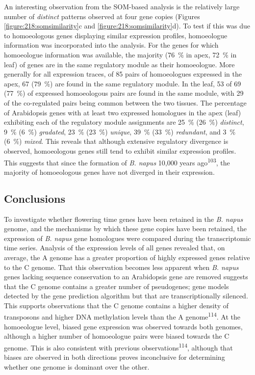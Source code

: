 \documentclass[12pt,]{book}
\begin{document}
An interesting observation from the SOM-based analysis is the relatively
large number of \emph{distinct} patterns observed at four gene copies
(Figures \ref{figure:218:somsimilarity}c and
\ref{figure:218:somsimilarity}d). To test if this was due to
homoeologous genes displaying similar expression profiles, homoeologue
information was incorporated into the analysis. For the genes for which
homoeologue information was available, the majority (76~\% in apex,
72~\% in leaf) of genes are in the same regulatory module as their
homoeologue. More generally for all expression traces, of 85 pairs of
homoeologues expressed in the apex, 67 (79~\%) are found in the same
regulatory module. In the leaf, 53 of 69 (77~\%) of expressed
homoeologous pairs are found in the same module, with 29 of the
co-regulated pairs being common between the two tissues. The percentage
of Arabidopsis genes with at least two expressed homologues in the apex
(leaf) exhibiting each of the regulatory module assignments are 25~\%
(26~\%) \emph{distinct}, 9~\% (6~\%) \emph{gradated}, 23~\% (23~\%)
\emph{unique}, 39~\% (33~\%) \emph{redundant}, and 3~\% (6~\%)
\emph{mixed}. This reveals that although extensive regulatory divergence
is observed, homoeologous genes still tend to exhibit similar expression
profiles. This suggests that since the formation of \emph{B. napus}
10,000 years ago\textsuperscript{103}, the majority of homoeologous
genes have not diverged in their expression.

\subsection{Conclusions}\label{conclusions-1}

To investigate whether flowering time genes have been retained in the
\emph{B. napus} genome, and the mechanisms by which these gene copies
have been retained, the expression of \emph{B. napus} gene homologues
were compared during the transcriptomic time series. Analysis of the
expression levels of all genes revealed that, on average, the A genome
has a greater proportion of highly expressed genes relative to the C
genome. That this observation becomes less apparent when \emph{B. napus}
genes lacking sequence conservation to an Arabidopsis gene are removed
suggests that the C genome contains a greater number of pseudogenes;
gene models detected by the gene prediction algorithm but that are
transcriptionally silenced. This supports observations that the C genome
contains a higher density of transposons and higher DNA methylation
levels than the A genome\textsuperscript{114}. At the homoeologue level,
biased gene expression was observed towards both genomes, although a
higher number of homoeologue pairs were biased towards the C genome.
This is also consistent with previous observations\textsuperscript{114},
although that biases are observed in both directions proves inconclusive
for determining whether one genome is dominant over the other.
\end{document}
